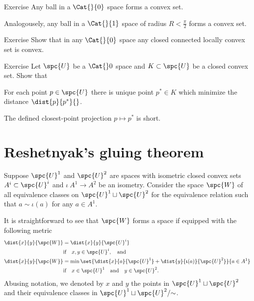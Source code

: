 \begin{thm}{Exercise}\label{ex:convex-balls}
Any ball in a $\Cat{}{0}$ space forms a convex set.

Analogousely, any ball in a $\Cat{}{1}$ space of radius $R<\tfrac\pi2$ forms a convex set.
\end{thm}

\begin{thm}{Exercise}\label{ex:locally-convex}
Show that in any $\Cat{}{0}$ space any closed connected locally convex set is convex.
\end{thm}

\begin{thm}{Exercise}\label{ex:closest-point}
Let  $\spc{U}$ be a $\Cat{}0$ space 
and $K\subset \spc{U}$ be a closed convex set.
Show that 

\begin{subthm}{}
For each point $p\in \spc{U}$ there is unique point $p^*\in K$ which minimize the distance $\dist{p}{p^*}{}$.
\end{subthm}

\begin{subthm}{}
The defined closest-point projection $p\mapsto p^*$ is short. 
\end{subthm}

\end{thm}


\section{Reshetnyak's gluing theorem}\label{sec:cba-gluing}

Suppose 
$\spc{U}^1$ and $\spc{U}^2$ are spaces 
with isometric closed convex sets $A^i\subset\spc{U}^i$ and $\iota\:A^1\to A^2$ be an isometry.
Consider the space $\spc{W}$ of all equivalence classes on $\spc{U}^1\sqcup\spc{U}^2$ for the equivalence relation such that $a\sim\iota(a)$ for any $a\in A^1$.

It is straightforward to see that $\spc{W}$ forms a space if equipped with the following metric
\begin{align*}
\dist{x}{y}{\spc{W}}&=\dist{x}{y}{\spc{U}^i}
\\
&\text{if}\quad x,y\in \spc{U}^i,\quad\text{and}
\\
\dist{x}{y}{\spc{W}}&=\min\set{\dist{x}{a}{\spc{U}^1}+\dist{y}{\iota(a)}{\spc{U}^2}}{a\in A^1}
\\
&\text{if}\quad x\in \spc{U}^1\quad\text{and}\quad y\in \spc{U}^2.
\end{align*}
Abusing notation, we denoted by $x$ and $y$ the points in $\spc{U}^1\sqcup\spc{U}^2$ and their equivalence classes in $\spc{U}^1\sqcup\spc{U}^2/{{\sim}}$.

